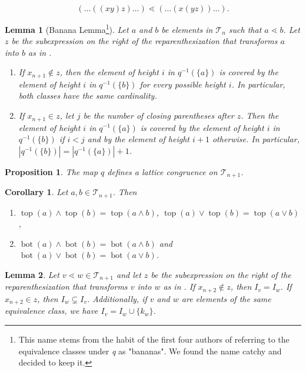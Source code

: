 \documentclass[10pt,a4paper]{amsart}
\newtheorem{lemma}{Lemma}
\newtheorem{proposition}{Proposition}
\newtheorem{corollary}{Corollary}
\newcommand{\botmap}{\operatorname{bot}}
\newcommand{\cT}{\mathcal{T}}
\newcommand{\topmap}{\operatorname{top}}
\begin{document}
\begin{equation}\label{eq:coverRel}
(\dots((xy)z)\dots) \lessdot (\dots (x(yz))\dots).
\end{equation}

\begin{lemma}[Banana Lemma\footnote{This name stems from the habit of the first four authors of referring to the equivalence classes under \emph{q} as "bananas". We found the name catchy and decided to keep it.}]\label{lem:banana}
    Let $a$ and $b$ be elements in $\cT_{n}$ such that $a \lessdot b$. Let $z$ be the subexpression on the right of the reparenthesization that transforms $a$ into $b$ as in .
    \begin{enumerate}
        \item If $x_{n+1} \notin z$, then the element of height $i$ in $q^{-1}(\{a\})$ is covered by the element of height $i$ in $q^{-1}(\{b\})$ for every possible height $i$. In particular, both classes have the same cardinality.
        \item If $x_{n+1} \in z$, let $j$ be the number of closing parentheses after $z$. Then the element of height $i$ in $q^{-1}(\{a\})$ is covered by the element of height $i$ in $q^{-1}(\{b\})$ if $i < j$ and by the element of height $i+1$ otherwise. In particular, $|q^{-1}(\{b\})| = |q^{-1}(\{a\})| + 1$.
    \end{enumerate}
\end{lemma}

\begin{proposition}\label{prop: LatticeCongruence}
    The map $q$ defines a lattice congruence on $\cT_{n+1}$.
\end{proposition}

\begin{corollary}\label{cor: bot and top meet and join}
    Let $a,b \in \cT_{n+1}$. Then
    \begin{enumerate}
        \item $\topmap(a)\wedge \topmap(b) = \topmap(a\wedge b)$, $\topmap(a)\vee \topmap(b) = \topmap(a\vee b)$,
        \item $\botmap(a)\wedge \botmap(b) = \botmap(a\wedge b)$ and $\botmap(a)\vee \botmap(b) = \botmap(a\vee b)$.
    \end{enumerate}
\end{corollary}

\begin{lemma}\label{lem: closing parentheses in equivalence class}
    Let $v\lessdot w \in \cT_{n+1}$ and let $z$ be the subexpression on the right of the reparenthesization that transforms $v$ into $w$ as in . If $x_{n+2}\notin z$, then $I_v = I_w$. If $x_{n+2}\in z$, then $I_w\subsetneq I_v$. Additionally, if $v$ and $w$ are elements of the same equivalence class, we have $I_v = I_w \cup \{k_w\}$.
\end{lemma}
\end{document}
